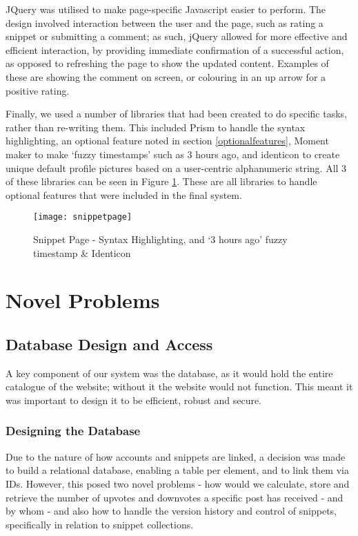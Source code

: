 JQuery was utilised to make page-specific Javascript easier to perform. 
The design involved interaction between the user and the page, such as rating a snippet or submitting a comment; as such, jQuery allowed for more effective and efficient interaction, by providing immediate confirmation of a successful action, as opposed to refreshing the page to show the updated content.
Examples of these are showing the comment on screen, or colouring in an up arrow for a positive rating. 

Finally, we used a number of libraries that had been created to do specific tasks, rather than re-writing them. 
This included Prism to handle the syntax highlighting, an optional feature noted in section \ref{optionalfeatures}, Moment maker to make `fuzzy timestamps' such as 3 hours ago, and identicon to create unique default profile pictures based on a user-centric alphanumeric string. 
All 3 of these libraries can be seen in Figure \ref{snippetpage}.
These are all libraries to handle optional features that were included in the final system.

\begin{figure}[htb!]
  \centering
  \texttt{[image: snippetpage]}
  \caption{Snippet Page - Syntax Highlighting, and `3 hours ago' fuzzy timestamp \& Identicon \label{snippetpage}}
\end{figure}

\section{Novel Problems}

\subsection{Database Design and Access}

A key component of our system was the database, as it would hold the entire catalogue of the website; without it the website would not function.
This meant it was important to design it to be efficient, robust and secure. 

\subsubsection{Designing the Database}
Due to the nature of how accounts and snippets are linked, a decision was made to build a relational database, enabling a table per element, and to link them via IDs.
However, this posed two novel problems - how would we calculate, store and retrieve the number of upvotes and downvotes a specific post has received - and by whom - and also how to handle the version history and control of snippets, specifically in relation to snippet collections.


